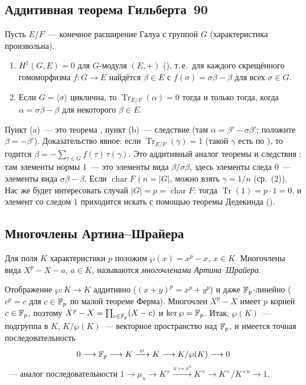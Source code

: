 \subsection*{Аддитивная теорема Гильберта~90}

\begin{lemma}
Пусть $E/F$~--- конечное расширение Галуа с группой $G$ (характеристика произвольна).
\begin{enumerate}[label=\textup{(\alph*)}]
\item $H^1(G,E)=0$ для $G$-модуля $(E,+)$ (), т.\,е.\ для каждого скрещённого гомоморфизма $f\colon G\to E$
найдётся $\beta\in E$ с $f(\sigma)=\sigma\beta-\beta$ для всех $\sigma\in G$.
\item Если $G=\langle\sigma\rangle$ циклична, то $\operatorname{Tr}_{E/F}(\alpha)=0$ тогда и только тогда, когда
$\alpha=\sigma\beta-\beta$ для некоторого $\beta\in E$.
\end{enumerate}
\end{lemma}

Пункт (a)~--- это теорема , пункт (b)~--- следствие  (там $\alpha=\beta'-\sigma\beta'$; положите
$\beta=-\beta'$). Доказательство  явное: если $\operatorname{Tr}_{E/F}(\gamma)=1$ (такой $\gamma$ есть по ), то
годится $\beta=-\sum_{\tau\in G}f(\tau)\,\tau(\gamma)$. Это аддитивный аналог теоремы  и следствия : там элементы
нормы $1$~--- это элементы вида $\beta/\sigma\beta$, здесь элементы следа $0$~--- элементы вида $\sigma\beta-\beta$. Если
$\operatorname{char}F\nmid n=|G|$, можно взять $\gamma=1/n$ (ср.\ (2)). Нас же будет интересовать случай
$|G|=p=\operatorname{char}F$: тогда $\operatorname{Tr}(1)=p\cdot1=0$, и элемент со следом $1$ приходится искать с помощью
теоремы Дедекинда ().

\subsection*{Многочлены Артина--Шрайера}

\begin{definition}[5.32b]
Для поля $K$ характеристики $p$ положим $\wp(x)=x^p-x$, $x\in K$. Многочлены вида $X^p-X-a$, $a\in K$, называются
\emph{многочленами Артина--Шрайера}.
\end{definition}

Отображение $\wp\colon K\to K$ аддитивно ($(x+y)^p=x^p+y^p$) и даже $\mathbb F_p$-линейно ($c^p=c$ для $c\in\mathbb F_p$ по малой
теореме Ферма). Многочлен $X^p-X$ имеет $p$ корней $c\in\mathbb F_p$, поэтому $X^p-X=\prod_{c\in\mathbb F_p}(X-c)$ и
$\ker\wp=\mathbb F_p$. Итак, $\wp(K)$~--- подгруппа в $K$, $K/\wp(K)$~--- векторное пространство над $\mathbb F_p$, и имеется точная
последовательность
\[
0\longrightarrow\mathbb F_p\longrightarrow K\xrightarrow{\ \wp\ }K\longrightarrow K/\wp(K)\longrightarrow0
\]
~--- аналог последовательности $1\to\mu_n\to K^\times\xrightarrow{x\mapsto x^n}K^\times\to K^\times/K^{\times n}\to1$.

